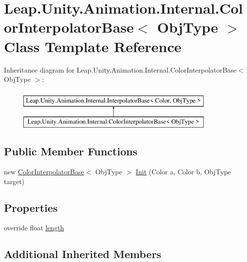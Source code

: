 \hypertarget{class_leap_1_1_unity_1_1_animation_1_1_internal_1_1_color_interpolator_base}{}\section{Leap.\+Unity.\+Animation.\+Internal.\+Color\+Interpolator\+Base$<$ Obj\+Type $>$ Class Template Reference}
\label{class_leap_1_1_unity_1_1_animation_1_1_internal_1_1_color_interpolator_base}
Inheritance diagram for Leap.\+Unity.\+Animation.\+Internal.\+Color\+Interpolator\+Base$<$ Obj\+Type $>$\+:\begin{figure}[H]
\begin{center}
\leavevmode
\includegraphics[height=2.000000cm]{class_leap_1_1_unity_1_1_animation_1_1_internal_1_1_color_interpolator_base}
\end{center}
\end{figure}
\subsection*{Public Member Functions}
\begin{DoxyCompactItemize}
\item 
new \mbox{\hyperlink{class_leap_1_1_unity_1_1_animation_1_1_internal_1_1_color_interpolator_base}{Color\+Interpolator\+Base}}$<$ Obj\+Type $>$ \mbox{\hyperlink{class_leap_1_1_unity_1_1_animation_1_1_internal_1_1_color_interpolator_base_a1f9258db6616665f648229246923b03c}{Init}} (Color a, Color b, Obj\+Type target)
\end{DoxyCompactItemize}
\subsection*{Properties}
\begin{DoxyCompactItemize}
\item 
override float \mbox{\hyperlink{class_leap_1_1_unity_1_1_animation_1_1_internal_1_1_color_interpolator_base_aa24da3192850eaec486de7cf66562047}{length}}
\end{DoxyCompactItemize}
\subsection*{Additional Inherited Members}


